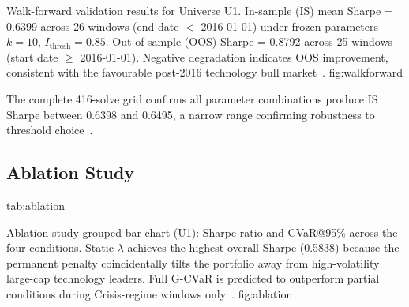   {Walk-forward validation results for Universe U1. In-sample (IS)
   mean Sharpe = 0.6399 across 26 windows (end date $<$ 2016-01-01)
   under frozen parameters $k=10$, $I_{\text{thresh}}=0.85$.
   Out-of-sample (OOS) Sharpe = 0.8792 across 25 windows
   (start date $\geq$ 2016-01-01). Negative degradation indicates OOS
   improvement, consistent with the favourable post-2016 technology bull
   market~\citep{gu2020,harvey2016}.}
  {fig:walkforward}

The complete 416-solve grid confirms all parameter combinations produce IS
Sharpe between 0.6398 and 0.6495, a narrow range confirming robustness to
threshold choice~\citep{harvey2016}.

\subsection{Ablation Study}

  {tab:ablation}
  {}

  {Ablation study grouped bar chart (U1): Sharpe ratio and CVaR@95\%
   across the four conditions. Static-$\lambda$ achieves the highest
   overall Sharpe (0.5838) because the permanent penalty
   coincidentally tilts the portfolio away from high-volatility
   large-cap technology leaders. Full G-CVaR is predicted to
   outperform partial conditions during Crisis-regime windows
   only~\citep{ang2002,hamilton1989}.}
  {fig:ablation}

